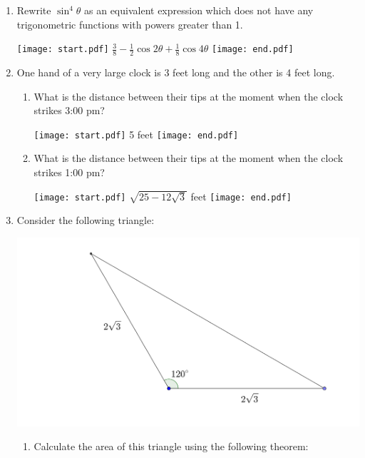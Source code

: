 \documentclass[12pt]{article}
\begin{document}
\begin{enumerate}
\begin{enumerate}
\end{enumerate}

\item Rewrite $\sin^4\theta$ as an equivalent expression which does not have any trigonometric functions with powers greater than 1.

\texttt{[image: start.pdf]}
{$\frac{3}{8}-\frac{1}{2}\cos2\theta+\frac{1}{8}\cos4\theta$}
\texttt{[image: end.pdf]}


\item One hand of a very large clock is 3 feet long and the other is 4 feet long.

\begin{enumerate}

\item What is the distance between their tips at the moment when the clock strikes 3:00 pm?

\texttt{[image: start.pdf]}
{5 feet}
\texttt{[image: end.pdf]}


\item What is the distance between their tips at the moment when the clock strikes 1:00 pm?

\texttt{[image: start.pdf]}
{$\sqrt{25-12\sqrt{3}}$ feet}
\texttt{[image: end.pdf]}


\end{enumerate}

\item Consider the following triangle:

\begin{center}
\includegraphics[scale=0.15]{heron.pdf}
\end{center}

\begin{enumerate}

\item Calculate the area of this triangle using the following theorem:\\


\end{enumerate}
\end{enumerate}
\end{document}

